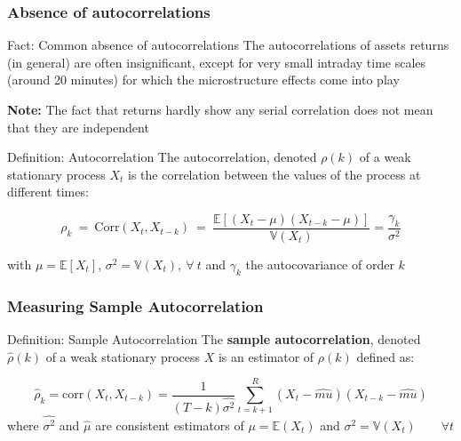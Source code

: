 \documentclass{beamer}
\begin{document}
\begin{frame}
  \frametitle{Absence of autocorrelations}
  \begin{exampleblock}{Fact: Common absence of autocorrelations}
    The autocorrelations of assets returns (in general) are often insignificant, except for very small intraday time scales (around 20 minutes) for which the microstructure effects come into play
  \end{exampleblock}

\textbf{Note:} The fact that returns hardly show any serial correlation does not mean that they are independent


\begin{block}{Definition: Autocorrelation}
  The autocorrelation, denoted $\rho(k)$ of a weak stationary process $X_t$ is the correlation between the values of the process at different times:

  \begin{equation*}
    \rho_k \ = \ \text{Corr}(X_t, X_{t-k}) \ = \ \frac{\mathbb{E}\left[ (X_t - \mu)(X_{t-k} - \mu)\right]}{\mathbb{V}(X_t)} = \frac{\gamma_k}{\sigma^2}
  \end{equation*}

with $\mu = \mathbb{E}[X_t]$, $\sigma^2 = \mathbb{V}(X_t), \ \forall \ t$ and $\gamma_k$ the autocovariance of order $k$
  
\end{block}

\end{frame}

\begin{frame}
  \frametitle{Measuring Sample Autocorrelation}
  \begin{block}{Definition: Sample Autocorrelation}
    The \textbf{sample autocorrelation}, denoted $\hat{\rho}(k)$ of a weak stationary process $X$ is an estimator of $\rho(k)$ defined as:

    \begin{equation*} 
      \hat{\rho}_k = \text{corr}(X_t, X_{t-k}) = \frac{1}{(T-k)\hat{\sigma^2}} \sum_{t=k+1}^{R}(X_t - \hat{mu})(X_{t-k} - \hat{mu})
    \end{equation*}
where $\hat{\sigma^2}$ and $\hat{\mu}$ are consistent estimators of $\mu = \mathbb{E}(X_t)$ and $\sigma^2 = \mathbb{V}(X_t) \qquad \forall t$
  \end{block}
\end{frame}
\end{document}

